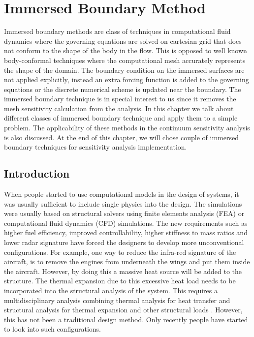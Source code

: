 \chapter{Immersed Boundary Method}\label{ch:immersedBoundary}
Immersed boundary methods are class of techniques in computational fluid dynamics where the governing equations are solved on cartesian grid that does not conform to the shape of the body in the flow. This is opposed to well known body-conformal techniques where the computational mesh accurately represents the shape of the domain. The boundary condition on the immersed surfaces are not applied explicitly, instead an extra forcing function is added to the governing equations or the discrete numerical scheme is updated near the boundary. The immersed boundary technique is in special interest to us since it removes the mesh sensitivity calculation from the analysis. In this chapter we talk about different classes of immersed boundary technique and apply them to a simple problem. The applicability of these methods in the continuum sensitivity analysis is also discussed. At the end of this chapter, we will chose couple of immersed boundary techniques for sensitivity analysis implementation.

\section{Introduction}
When people started to use computational models in the design of systems, it was usually sufficient to include single physics into the design. The simulations were usually based on structural solvers using finite elements analysis (FEA) or computational fluid dynamics (CFD) simulations. The new requirements such as higher fuel efficiency, improved controllability, higher stiffness to mass ratios and lower radar signature have forced the designers to develop more unconventional configurations. For example, one way to reduce the infra-red signature of the aircraft, is to remove the engines from underneath the wings and put them inside the aircraft. However, by doing this a massive heat source will be added to the structure. The thermal expansion due to this excessive heat load needs to be incorporated into the structural analysis of the system. This requires a multidisciplinary analysis combining thermal analysis for heat transfer and structural analysis for thermal expansion and other structural loads \cite{deaton2013stiffening}. However, this has not been a traditional design method. Only recently people have started to look into such configurations.

